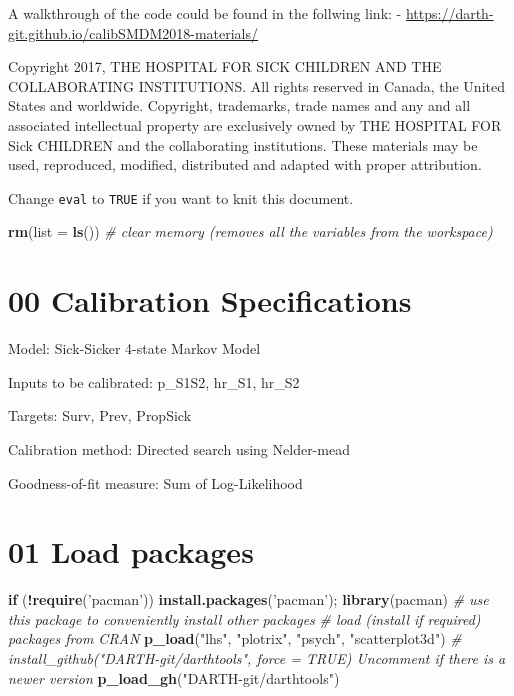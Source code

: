 \documentclass[
]{article}
\newenvironment{Shaded}{\begin{snugshade}}{\end{snugshade}}
\newcommand{\CommentTok}[1]{\textcolor[rgb]{0.56,0.35,0.01}{\textit{#1}}}
\newcommand{\ControlFlowTok}[1]{\textcolor[rgb]{0.13,0.29,0.53}{\textbf{#1}}}
\newcommand{\DataTypeTok}[1]{\textcolor[rgb]{0.13,0.29,0.53}{#1}}
\newcommand{\KeywordTok}[1]{\textcolor[rgb]{0.13,0.29,0.53}{\textbf{#1}}}
\newcommand{\NormalTok}[1]{#1}
\newcommand{\OperatorTok}[1]{\textcolor[rgb]{0.81,0.36,0.00}{\textbf{#1}}}
\newcommand{\StringTok}[1]{\textcolor[rgb]{0.31,0.60,0.02}{#1}}
\begin{document}
A walkthrough of the code could be found in the follwing link: -
\url{https://darth-git.github.io/calibSMDM2018-materials/}

Copyright 2017, THE HOSPITAL FOR SICK CHILDREN AND THE COLLABORATING
INSTITUTIONS. All rights reserved in Canada, the United States and
worldwide. Copyright, trademarks, trade names and any and all associated
intellectual property are exclusively owned by THE HOSPITAL FOR Sick
CHILDREN and the collaborating institutions. These materials may be
used, reproduced, modified, distributed and adapted with proper
attribution.

\newpage

Change \texttt{eval} to \texttt{TRUE} if you want to knit this document.

\begin{Shaded}
\begin{Highlighting}[]
\KeywordTok{rm}\NormalTok{(}\DataTypeTok{list =} \KeywordTok{ls}\NormalTok{())      }\CommentTok{# clear memory (removes all the variables from the workspace)}
\end{Highlighting}
\end{Shaded}

\hypertarget{calibration-specifications}{%
\section{00 Calibration
Specifications}\label{calibration-specifications}}

Model: Sick-Sicker 4-state Markov Model

Inputs to be calibrated: p\_S1S2, hr\_S1, hr\_S2

Targets: Surv, Prev, PropSick

Calibration method: Directed search using Nelder-mead

Goodness-of-fit measure: Sum of Log-Likelihood

\hypertarget{load-packages}{%
\section{01 Load packages}\label{load-packages}}

\begin{Shaded}
\begin{Highlighting}[]
\ControlFlowTok{if}\NormalTok{ (}\OperatorTok{!}\KeywordTok{require}\NormalTok{(}\StringTok{'pacman'}\NormalTok{)) }\KeywordTok{install.packages}\NormalTok{(}\StringTok{'pacman'}\NormalTok{); }\KeywordTok{library}\NormalTok{(pacman) }\CommentTok{# use this package to conveniently install other packages}
\CommentTok{# load (install if required) packages from CRAN}
\KeywordTok{p_load}\NormalTok{(}\StringTok{"lhs"}\NormalTok{, }\StringTok{"plotrix"}\NormalTok{, }\StringTok{"psych"}\NormalTok{, }\StringTok{"scatterplot3d"}\NormalTok{)  }
\CommentTok{# install_github("DARTH-git/darthtools", force = TRUE) Uncomment if there is a newer version}
\KeywordTok{p_load_gh}\NormalTok{(}\StringTok{"DARTH-git/darthtools"}\NormalTok{)}
\end{Highlighting}
\end{Shaded}
\end{document}
